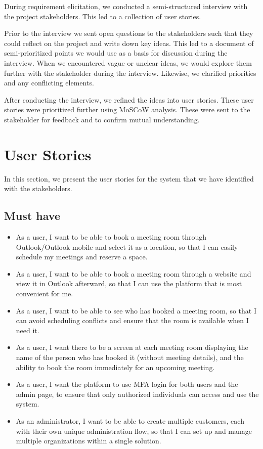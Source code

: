 During requirement elicitation, we conducted a semi-structured interview with the project stakeholders.
This led to a collection of user stories.

Prior to the interview we sent open questions to the stakeholders such that they could reflect on the project and write down key ideas.
This led to a document of semi-prioritized points we would use as a basis for discussion during the interview.
When we encountered vague or unclear ideas, we would explore them further with the stakeholder during the interview.
Likewise, we clarified priorities and any conflicting elements.

After conducting the interview, we refined the ideas into user stories. These user stories were prioritized further using MoSCoW analysis.
These were sent to the stakeholder for feedback and to confirm mutual understanding.


\section{User Stories}
In this section, we present the user stories for the system that we have identified with the stakeholders.

\subsection{Must have}
\begin{itemize}
\item As a user, I want to be able to book a meeting room through Outlook/Outlook mobile and select it as a location, so that I can easily schedule my meetings and reserve a space.
\item As a user, I want to be able to book a meeting room through a website and view it in Outlook afterward, so that I can use the platform that is most convenient for me.
\item As a user, I want to be able to see who has booked a meeting room, so that I can avoid scheduling conflicts and ensure that the room is available when I need it.
\item As a user, I want there to be a screen at each meeting room displaying the name of the person who has booked it (without meeting details), and the ability to book the room immediately for an upcoming meeting.
\item As a user, I want the platform to use MFA login for both users and the admin page, to ensure that only authorized individuals can access and use the system.
\item As an administrator, I want to be able to create multiple customers, each with their own unique administration flow, so that I can set up and manage multiple organizations within a single solution. %
\end{itemize}


